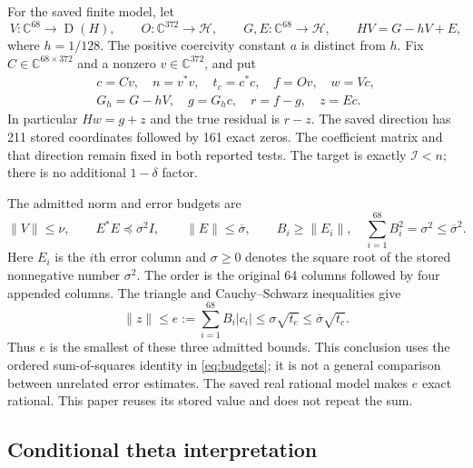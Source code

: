 \documentclass[11pt,a4paper]{article}
\newcommand{\HH}{\mathcal H}
\newcommand{\C}{\mathbb C}
\newcommand{\Dom}{\operatorname{D}}
\newcommand{\norm}[1]{\lVert #1\rVert}
\newcommand{\Iresp}{\mathcal I}
\newcommand{\sigmab}{\overline{\sigma}}
\theoremstyle{definition}
\theoremstyle{remark}
\numberwithin{equation}{section}
\begin{document}
For the saved finite model, let
\begin{equation}\label{eq:maps}
 V:\C^{68}\longrightarrow\Dom(H),\qquad
 O:\C^{372}\longrightarrow\HH,\qquad
 G,E:\C^{68}\longrightarrow\HH,
 \qquad HV=G-hV+E,
\end{equation}
where $h=1/128$. The positive coercivity constant $a$ is distinct from
$h$. Fix $C\in\C^{68\times372}$ and a nonzero $v\in\C^{372}$, and put
\begin{equation}\label{eq:vectors}
\begin{gathered}
 c=Cv,\quad n=v^*v,\quad t_c=c^*c,\quad f=Ov,\quad w=Vc,\\
 G_h=G-hV,\quad g=G_hc,\quad r=f-g,\quad z=Ec.
\end{gathered}
\end{equation}
In particular $Hw=g+z$ and the true residual is $r-z$.
The saved direction has 211 stored coordinates followed by 161 exact
zeros. The coefficient matrix and that direction remain fixed in both
reported tests. The target is exactly $\Iresp<n$; there is no additional
$1-\delta$ factor.

The admitted norm and error budgets are
\begin{equation}\label{eq:budgets}
 \norm V\le\nu,\qquad E^*E\preceq\sigma^2 I,\qquad
 \norm E\le\sigmab,\qquad
 B_i\ge\norm{E_i},\quad
 \sum_{i=1}^{68}B_i^2=\sigma^2\le\sigmab^2.
\end{equation}
Here $E_i$ is the $i$th error column and $\sigma\ge0$ denotes the
square root of the stored nonnegative number $\sigma^2$.
The order is the original 64 columns followed by four appended columns.
The triangle and Cauchy--Schwarz inequalities give
\begin{equation}\label{eq:e}
 \norm z\le e:=\sum_{i=1}^{68}B_i|c_i|
 \le \sigma\sqrt{t_c}\le\sigmab\sqrt{t_c}.
\end{equation}
Thus $e$ is the smallest of these three admitted bounds. This conclusion
uses the ordered sum-of-squares identity in \eqref{eq:budgets}; it is not
a general comparison between unrelated error estimates. The saved
real rational model makes $e$ exact rational. This paper reuses its
stored value and does not repeat the sum.

\subsection{Conditional theta interpretation}
\end{document}
